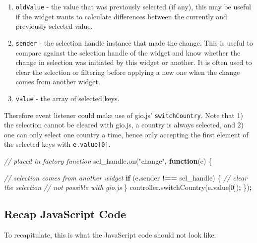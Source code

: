 \documentclass[
]{krantz}
\makeatletter
\newenvironment{Shaded}{\begin{snugshade}}{\end{snugshade}}
\newcommand{\AttributeTok}[1]{\textcolor[rgb]{0.61,0.61,0.61}{#1}}
\newcommand{\CommentTok}[1]{\textcolor[rgb]{0.37,0.37,0.37}{\textit{#1}}}
\newcommand{\ControlFlowTok}[1]{\textcolor[rgb]{0.27,0.27,0.27}{\textbf{#1}}}
\newcommand{\DecValTok}[1]{\textcolor[rgb]{0.06,0.06,0.06}{#1}}
\newcommand{\FunctionTok}[1]{\textcolor[rgb]{0,0,0}{#1}}
\newcommand{\KeywordTok}[1]{\textcolor[rgb]{0.27,0.27,0.27}{\textbf{#1}}}
\newcommand{\NormalTok}[1]{#1}
\newcommand{\OperatorTok}[1]{\textcolor[rgb]{0.43,0.43,0.43}{\textbf{#1}}}
\newcommand{\StringTok}[1]{\textcolor[rgb]{0.5,0.5,0.5}{#1}}
\providecommand{\tightlist}{%
  \setlength{\itemsep}{0pt}\setlength{\parskip}{0pt}}
\newenvironment{kframe}{%
\medskip{}
\setlength{\fboxsep}{.8em}
 \def\at@end@of@kframe{}%
 \ifinner\ifhmode%
  \def\at@end@of@kframe{\end{minipage}}%
  \begin{minipage}{\columnwidth}%
 \fi\fi%
 \def\FrameCommand##1{\hskip\@totalleftmargin \hskip-\fboxsep
 \colorbox{shadecolor}{##1}\hskip-\fboxsep
     \hskip-\linewidth \hskip-\@totalleftmargin \hskip\columnwidth}%
 \MakeFramed {\advance\hsize-\width
   \@totalleftmargin\z@ \linewidth\hsize
   \@setminipage}}%
 {\par\unskip\endMakeFramed%
 \at@end@of@kframe}
\renewenvironment{Shaded}{\begin{kframe}}{\end{kframe}}
\makeatother
\begin{document}
\begin{enumerate}
\def\labelenumi{\arabic{enumi}.}
\tightlist
\item
  \texttt{oldValue} - the value that was previously selected (if any), this may be useful if the widget wants to calculate differences between the currently and previously selected value.
\item
  \texttt{sender} - the selection handle instance that made the change. This is useful to compare against the selection handle of the widget and know whether the change in selection was initiated by this widget or another. It is often used to clear the selection or filtering before applying a new one when the change comes from another widget.
\item
  \texttt{value} - the array of selected keys.
\end{enumerate}

Therefore event listener could make use of gio.js' \texttt{switchCountry}. Note that 1) the selection cannot be cleared with gio.js, a country is always selected, and 2) one can only select one country a time, hence only accepting the first element of the selected keys with \texttt{e.value{[}0{]}}.

\begin{Shaded}
\begin{Highlighting}[]
\CommentTok{// placed in factory function}
\NormalTok{sel\_handle}\OperatorTok{.}\FunctionTok{on}\NormalTok{(}\StringTok{"change"}\OperatorTok{,} \KeywordTok{function}\NormalTok{(e) \{}

  \CommentTok{// selection comes from another widget}
  \ControlFlowTok{if}\NormalTok{ (e}\OperatorTok{.}\AttributeTok{sender} \OperatorTok{!==}\NormalTok{ sel\_handle) \{}
    \CommentTok{// clear the selection}
    \CommentTok{// not possible with gio.js}
\NormalTok{  \}}
\NormalTok{  controller}\OperatorTok{.}\FunctionTok{switchCountry}\NormalTok{(e}\OperatorTok{.}\AttributeTok{value}\NormalTok{[}\DecValTok{0}\NormalTok{])}\OperatorTok{;}
\NormalTok{\})}\OperatorTok{;}
\end{Highlighting}
\end{Shaded}

\hypertarget{linking-widgets-recap}{%
\subsection{Recap JavaScript Code}\label{linking-widgets-recap}}

To recapitulate, this is what the JavaScript code should not look like.
\end{document}
